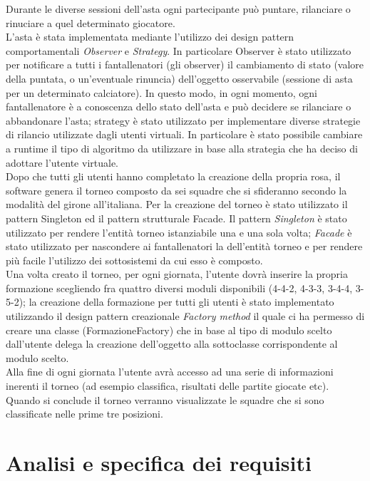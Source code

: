 \documentclass[12pt,a4paper]{article}
\begin{document}
Durante le diverse sessioni dell'asta ogni partecipante può puntare, rilanciare o rinuciare a quel determinato giocatore.\\
L'asta è stata implementata mediante l'utilizzo dei design pattern comportamentali \textit{Observer} e \textit{Strategy}. In particolare Observer è stato utilizzato per notificare a tutti i fantallenatori (gli observer) il cambiamento di stato (valore della puntata, o un'eventuale rinuncia) dell'oggetto osservabile (sessione di asta per un determinato calciatore). In questo modo, in ogni momento, ogni fantallenatore è a conoscenza dello stato dell'asta e può decidere se rilanciare o abbandonare l'asta; strategy è stato utilizzato per implementare diverse strategie di rilancio utilizzate dagli utenti virtuali. In particolare è stato possibile cambiare a runtime il tipo di algoritmo da utilizzare in base alla strategia che ha deciso di adottare l'utente virtuale.\\
Dopo che tutti gli utenti hanno completato la creazione della propria rosa, il software genera il torneo composto da sei squadre che si sfideranno secondo la modalità del girone all'italiana. Per la creazione del torneo è stato utilizzato il pattern  Singleton ed il pattern strutturale Facade. Il pattern \textit{Singleton} è stato utilizzato per rendere l'entità torneo istanziabile una e una sola volta; \textit{Facade} è stato utilizzato per nascondere ai fantallenatori la   dell'entità torneo e per rendere più facile l'utilizzo dei sottosistemi da cui esso è composto.\\
Una volta creato il torneo, per ogni giornata, l'utente dovrà inserire la propria formazione scegliendo fra quattro diversi moduli disponibili (4-4-2, 4-3-3, 3-4-4, 3-5-2); la creazione della formazione per tutti gli utenti è stato implementato utilizzando il design pattern creazionale \textit{Factory method} il quale ci ha permesso di creare una classe (FormazioneFactory) che in base al tipo di modulo scelto dall'utente delega la creazione dell'oggetto alla sottoclasse corrispondente al modulo scelto.\\
Alla fine di ogni giornata l'utente avrà accesso ad una serie di informazioni inerenti il torneo (ad esempio classifica, risultati delle partite giocate etc).\\ Quando si conclude il torneo verranno visualizzate le squadre che si sono classificate nelle prime tre posizioni.
\section{Analisi e specifica dei requisiti}
\end{document}
